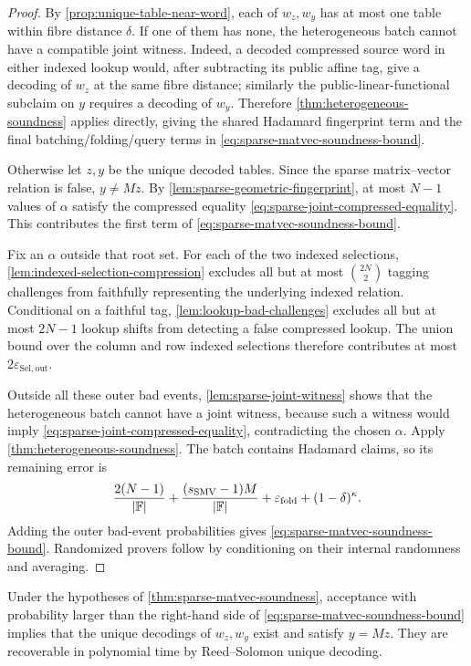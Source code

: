\begin{proof}
By \cref{prop:unique-table-near-word}, each of $w_z,w_y$ has at most one table within fibre distance $\delta$.  If one of them has none, the heterogeneous batch cannot have a compatible joint witness.  Indeed, a decoded compressed source word in either indexed lookup would, after subtracting its public affine tag, give a decoding of $w_z$ at the same fibre distance; similarly the public-linear-functional subclaim on $y$ requires a decoding of $w_y$.  Therefore \cref{thm:heterogeneous-soundness} applies directly, giving the shared Hadamard fingerprint term and the final batching/folding/query terms in \eqref{eq:sparse-matvec-soundness-bound}.

Otherwise let $z,y$ be the unique decoded tables.  Since the sparse matrix--vector relation is false, $y\ne Mz$.  By \cref{lem:sparse-geometric-fingerprint}, at most $N-1$ values of $\alpha$ satisfy the compressed equality \eqref{eq:sparse-joint-compressed-equality}.  This contributes the first term of \eqref{eq:sparse-matvec-soundness-bound}.

Fix an $\alpha$ outside that root set.  For each of the two indexed selections, \cref{lem:indexed-selection-compression} excludes all but at most $\binom{2N}{2}$ tagging challenges from faithfully representing the underlying indexed relation.  Conditional on a faithful tag, \cref{lem:lookup-bad-challenges} excludes all but at most $2N-1$ lookup shifts from detecting a false compressed lookup.  The union bound over the column and row indexed selections therefore contributes at most $2\varepsilon_{\mathrm{Sel,out}}$.

Outside all these outer bad events, \cref{lem:sparse-joint-witness} shows that the heterogeneous batch cannot have a joint witness, because such a witness would imply \eqref{eq:sparse-joint-compressed-equality}, contradicting the chosen $\alpha$.  Apply \cref{thm:heterogeneous-soundness}.  The batch contains Hadamard claims, so its remaining error is
\[
  \frac{2(N-1)}{|\mathbb{F}|}
  +\frac{(s_{\mathrm{SMV}}-1)M}{|\mathbb{F}|}
  +\varepsilon_{\mathrm{fold}}
  +(1-\delta)^\kappa.
\]
Adding the outer bad-event probabilities gives \eqref{eq:sparse-matvec-soundness-bound}.  Randomized provers follow by conditioning on their internal randomness and averaging.
\end{proof}

\begin{corollary}
\label{cor:sparse-matvec-knowledge}
Under the hypotheses of \cref{thm:sparse-matvec-soundness}, acceptance with probability larger than the right-hand side of \eqref{eq:sparse-matvec-soundness-bound} implies that the unique decodings of $w_z,w_y$ exist and satisfy $y=Mz$.  They are recoverable in polynomial time by Reed--Solomon unique decoding.
\end{corollary}

